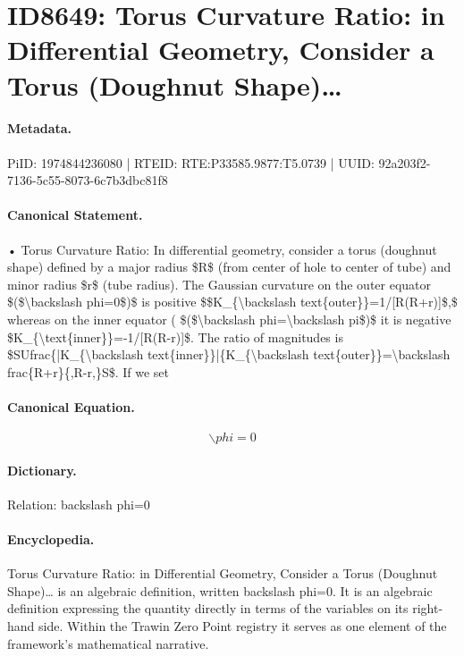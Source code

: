 \section*{ID8649: Torus Curvature Ratio: in Differential Geometry, Consider a Torus (Doughnut Shape)…}
\paragraph{Metadata.}
PiID: 1974844236080 | RTEID: RTE:P33585.9877:T5.0739 | UUID: 92a203f2-7136-5c55-8073-6c7b3dbc81f8

\paragraph{Canonical Statement.}
• Torus Curvature Ratio: In differential geometry, consider a torus (doughnut shape) defined by a major radius \$R\$ (from center of hole to center of tube) and minor radius \$r\$ (tube radius). The Gaussian curvature on the outer equator \$(\$\textbackslash{}backslash phi=0\$)\$ is positive \$\$K\_\{\textbackslash{}backslash text\{outer\}\}=1/[R(R+r)]\$,\$ whereas on the inner equator ( \$(\$\textbackslash{}backslash phi=\textbackslash{}backslash pi\$)\$ it is negative \$K\_\{\textbackslash{}text\{inner\}\}=-1/[R(R-r)]\$. The ratio of magnitudes is \$SUfrac\{|K\_\{\textbackslash{}backslash text\{inner\}\}|\{K\_\{\textbackslash{}backslash text\{outer\}\}=\textbackslash{}backslash frac\{R+r\}\{,R-r,\}S\$. If we set

\paragraph{Canonical Equation.}
\[
\backslash phi=0
\]

\paragraph{Dictionary.}
Relation: backslash phi=0

\paragraph{Encyclopedia.}
Torus Curvature Ratio: in Differential Geometry, Consider a Torus (Doughnut Shape)… is an algebraic definition, written backslash phi=0. It is an algebraic definition expressing the quantity directly in terms of the variables on its right-hand side. Within the Trawin Zero Point registry it serves as one element of the framework's mathematical narrative.
